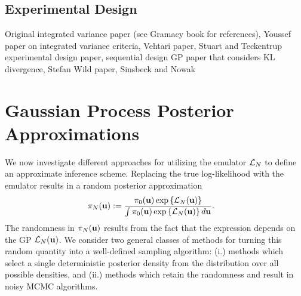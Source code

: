 \documentclass[12pt]{article}
\begin{document}
\subsection{Experimental Design}
Original integrated variance paper (see Gramacy book for references), Youssef paper on integrated variance criteria, Vehtari paper, Stuart and Teckentrup experimental 
design paper, sequential design GP paper that considers KL divergence, Stefan Wild paper, Sinsbeck and Nowak 

\section{Gaussian Process Posterior Approximations}
We now investigate different approaches for utilizing the emulator $\mathcal{L}_{N}$ to define an approximate inference scheme. Replacing the true log-likelihood 
with the emulator results in a random posterior approximation 
\begin{align}
\pi_{N}(\mathbf{u})
&:= \frac{\pi_0(\mathbf{u}) \exp\left\{\mathcal{L}_{N}(\mathbf{u}) \right\}}{\int \pi_0(\mathbf{u}) \exp\left\{\mathcal{L}_{N}(\mathbf{u}) \right\} d\mathbf{u}}.
\end{align}
The randomness in $\pi_{N}(\mathbf{u})$ results from the fact that the expression depends on the GP $\mathcal{L}_{N}(\mathbf{u})$. We consider 
two general classes of methods for turning this random quantity into a well-defined sampling algorithm: (i.) methods which select a single deterministic 
posterior density from the distribution over all possible densities, and (ii.) methods which retain the randomness and result in noisy MCMC algorithms. 

\end{document}
